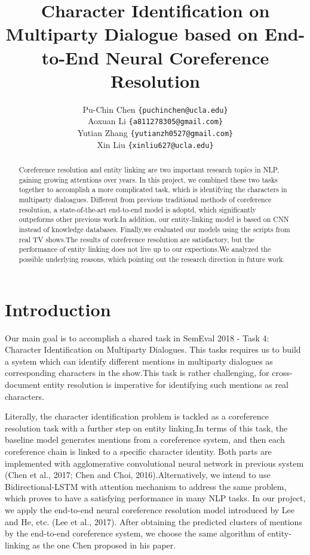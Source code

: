 \documentclass[11pt]{article}
\title{Character Identification on Multiparty Dialogue based on End-to-End Neural Coreference Resolution}
\author
{
   Pu-Chin Chen
  {\tt \{puchinchen@ucla.edu\}} \\
  Aoxuan Li 
  {\tt \{a811278305@gmail.com\}} \\
  Yutian Zhang
  {\tt \{yutianzh0527@gmail.com\}} \\
  Xin Liu
  {\tt \{xinliu627@ucla.edu\}} \\
}
\date{}
\begin{document}
\maketitle
\begin{abstract}
  Coreference resolution and entity linking are two important research topics in NLP, gaining growing attentions over years. In this project, we combined these two tasks together to accomplish a more complicated task, which is identifying the characters in multiparty dialoagues. Different from previous traditional methods of coreference resolution, a state-of-the-art end-to-end model is adoptd, which significantly outpeforms other previous work.In addition, our entity-linking model is based on CNN instead of knowledge databases. Finally,we evaluated our models using the scripts from real TV shows.The results of coreference resolution are satisfactory, but the performance of entity linking does not live up to our expections.We analyzed the possible underlying reasons, which pointing out the research direction in future work.
\end{abstract}

\section{Introduction}

Our main goal is to accomplish a shared task in SemEval 2018 - Task 4: Character Identification on Multiparty Dialogues. This tasks requires us to build a system which can identify different mentions in multiparty dialogues as corresponding characters in the show.This task is rather challenging, for cross-document entity resolution is imperative for identifying such mentions as real characters.

Literally, the character identification problem is tackled as a coreference resolution task with a further step on entity linking.In terms of this task, the baseline model generates mentions from a coreference system, and then each coreference chain is linked to a specific character identity. Both parts are implemented with agglomerative convolutional neural network in previous system (Chen et al., 2017; Chen and Choi, 2016).Alternatively, we intend to use Bidirectional-LSTM with attention mechanism to address the same problem, which proves to have a satisfying performance in many NLP tasks. In our project, we apply the end-to-end neural coreference resolution model introduced by Lee and He, etc. (Lee et al., 2017). After obtaining the predicted clusters of mentions by the end-to-end coreference system, we choose the same algorithm of entity-linking as the one Chen proposed in his paper.
\end{document}
